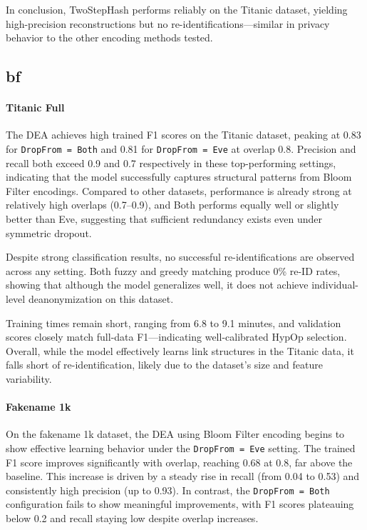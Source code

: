 In conclusion, TwoStepHash performs reliably on the Titanic dataset, yielding high-precision reconstructions but no re-identifications—similar in privacy behavior to the other encoding methods tested.


\subsection{\ac{bf}}

\paragraph{Titanic Full}

The DEA achieves high trained F1 scores on the Titanic dataset, peaking at 0.83 for \texttt{DropFrom = Both} and 0.81 for \texttt{DropFrom = Eve} at overlap 0.8.
Precision and recall both exceed 0.9 and 0.7 respectively in these top-performing settings, indicating that the model successfully captures structural patterns from Bloom Filter encodings.
Compared to other datasets, performance is already strong at relatively high overlaps (0.7–0.9), and Both performs equally well or slightly better than Eve, suggesting that sufficient redundancy exists even under symmetric dropout.

Despite strong classification results, no successful re-identifications are observed across any setting.
Both fuzzy and greedy matching produce 0\% re-ID rates, showing that although the model generalizes well, it does not achieve individual-level deanonymization on this dataset.

Training times remain short, ranging from 6.8 to 9.1 minutes, and validation scores closely match full-data F1—indicating well-calibrated HypOp selection.
Overall, while the model effectively learns link structures in the Titanic data, it falls short of re-identification, likely due to the dataset’s size and feature variability.


\paragraph{Fakename 1k}

On the fakename 1k dataset, the DEA using Bloom Filter encoding begins to show effective learning behavior under the \texttt{DropFrom = Eve} setting.
The trained F1 score improves significantly with overlap, reaching 0.68 at 0.8, far above the baseline.
This increase is driven by a steady rise in recall (from 0.04 to 0.53) and consistently high precision (up to 0.93).
In contrast, the \texttt{DropFrom = Both} configuration fails to show meaningful improvements, with F1 scores plateauing below 0.2 and recall staying low despite overlap increases.

